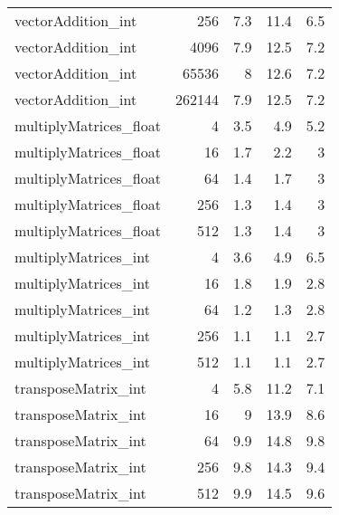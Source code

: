 \begin{tabular}{lrrrr}
 vectorAddition\_int     &    256 &                 7.3 &              11.4 &                 6.5 \\
 vectorAddition\_int     &   4096 &                 7.9 &              12.5 &                 7.2 \\
 vectorAddition\_int     &  65536 &                 8   &              12.6 &                 7.2 \\
 vectorAddition\_int     & 262144 &                 7.9 &              12.5 &                 7.2 \\
 multiplyMatrices\_float &      4 &                 3.5 &               4.9 &                 5.2 \\
 multiplyMatrices\_float &     16 &                 1.7 &               2.2 &                 3   \\
 multiplyMatrices\_float &     64 &                 1.4 &               1.7 &                 3   \\
 multiplyMatrices\_float &    256 &                 1.3 &               1.4 &                 3   \\
 multiplyMatrices\_float &    512 &                 1.3 &               1.4 &                 3   \\
 multiplyMatrices\_int   &      4 &                 3.6 &               4.9 &                 6.5 \\
 multiplyMatrices\_int   &     16 &                 1.8 &               1.9 &                 2.8 \\
 multiplyMatrices\_int   &     64 &                 1.2 &               1.3 &                 2.8 \\
 multiplyMatrices\_int   &    256 &                 1.1 &               1.1 &                 2.7 \\
 multiplyMatrices\_int   &    512 &                 1.1 &               1.1 &                 2.7 \\
 transposeMatrix\_int    &      4 &                 5.8 &              11.2 &                 7.1 \\
 transposeMatrix\_int    &     16 &                 9   &              13.9 &                 8.6 \\
 transposeMatrix\_int    &     64 &                 9.9 &              14.8 &                 9.8 \\
 transposeMatrix\_int    &    256 &                 9.8 &              14.3 &                 9.4 \\
 transposeMatrix\_int    &    512 &                 9.9 &              14.5 &                 9.6 \\

\end{tabular}
